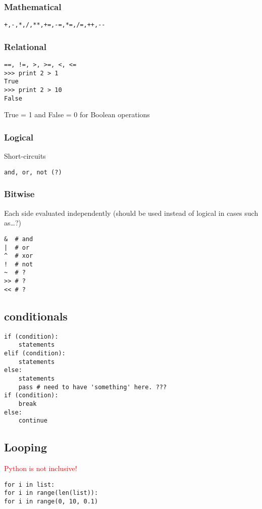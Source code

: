 \documentclass{article}
\begin{document}
\begin{multicols}{2}
\subsubsection{Mathematical}
\begin{lstlisting}
+,-,*,/,**,+=,-=,*=,/=,++,--
\end{lstlisting}
\subsubsection{Relational}
\begin{lstlisting}
==, !=, >, >=, <, <=
>>> print 2 > 1
True
>>> print 2 > 10
False
\end{lstlisting}
True = 1 and False = 0 for Boolean operations

\subsubsection{Logical}
Short-circuits
\begin{lstlisting}
and, or, not (?)
\end{lstlisting}

\subsubsection{Bitwise}
Each side evaluated independently
(should be used instead of logical in cases such as\ldots?)
\begin{lstlisting}
&  # and
|  # or
^  # xor
!  # not
~  # ?
>> # ?
<< # ?
\end{lstlisting}

\columnbreak

\subsection{conditionals}
\begin{lstlisting}
if (condition):
    statements
elif (condition):
    statements
else:
    statements
    pass # need to have 'something' here. ???
if (condition):
    break
else:
    continue
\end{lstlisting}

\subsection{Looping}
\textcolor{red}{Python is not inclusive!}

\begin{lstlisting}
for i in list:
for i in range(len(list)):
for i in range(0, 10, 0.1)


\end{lstlisting}
\end{multicols}
\end{document}
